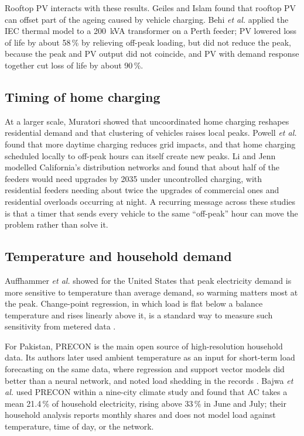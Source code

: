 \documentclass[conference]{IEEEtran}
\begin{document}
Rooftop PV interacts with these results. Geiles and Islam \cite{geiles2013}
found that rooftop PV can offset part of the ageing caused by vehicle
charging. Behi \emph{et al.} \cite{behi2017} applied the IEC thermal model to
a 200~kVA transformer on a Perth feeder; PV lowered loss of life by about
58\,\% by relieving off-peak loading, but did not reduce the peak, because the
peak and PV output did not coincide, and PV with demand response together cut
loss of life by about 90\,\%.

\subsection{Timing of home charging}
At a larger scale, Muratori \cite{muratori2018} showed that uncoordinated home
charging reshapes residential demand and that clustering of vehicles raises
local peaks. Powell \emph{et al.}
\cite{powell2022} found that more daytime charging reduces grid impacts, and
that home charging scheduled locally to off-peak hours can itself create new
peaks. Li and Jenn \cite{lijenn2024} modelled California's distribution
networks and found that about half of the feeders would need upgrades by 2035
under uncontrolled charging, with residential feeders needing about twice the
upgrades of commercial ones and residential overloads occurring at night. A
recurring message across these studies is that a timer that sends every
vehicle to the same ``off-peak'' hour can move the problem rather than solve
it.

\subsection{Temperature and household demand}
Auffhammer \emph{et al.} \cite{auffhammer2017} showed for the United States
that peak electricity demand is more sensitive to temperature than average
demand, so warming matters most at the peak. Change-point regression, in
which load is flat below a balance temperature and rises linearly above it,
is a standard way to measure such sensitivity from metered data
\cite{kissock2003}.

For Pakistan, PRECON \cite{precon} is the main open source of high-resolution
household data. Its authors later used ambient temperature as an input for
short-term load forecasting on the same data, where regression and support
vector models did better than a neural network, and noted load shedding in
the records \cite{nadeem2020}. Bajwa \emph{et al.} \cite{bajwa2026} used
PRECON within a nine-city climate study and found that AC takes a mean
21.4\,\% of household electricity, rising above 33\,\% in June and July; their
household analysis reports monthly shares and does not model load against
temperature, time of day, or the network.
\end{document}

